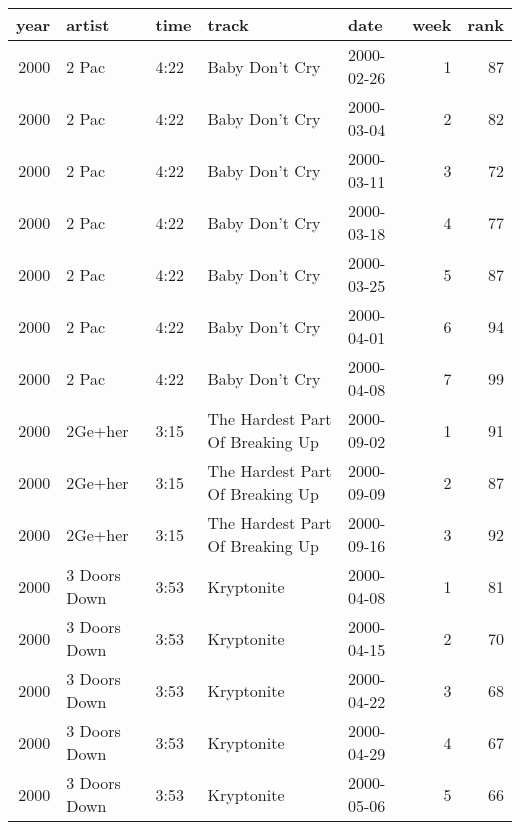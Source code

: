 \begin{tabular}{rllllrr}
  \toprule
 year & artist & time & track & date & week & rank \\ 
  \midrule
  2000 & 2 Pac & 4:22 & Baby Don't Cry & 2000-02-26 &   1 &  87 \\ 
  2000 & 2 Pac & 4:22 & Baby Don't Cry & 2000-03-04 &   2 &  82 \\ 
  2000 & 2 Pac & 4:22 & Baby Don't Cry & 2000-03-11 &   3 &  72 \\ 
  2000 & 2 Pac & 4:22 & Baby Don't Cry & 2000-03-18 &   4 &  77 \\ 
  2000 & 2 Pac & 4:22 & Baby Don't Cry & 2000-03-25 &   5 &  87 \\ 
  2000 & 2 Pac & 4:22 & Baby Don't Cry & 2000-04-01 &   6 &  94 \\ 
  2000 & 2 Pac & 4:22 & Baby Don't Cry & 2000-04-08 &   7 &  99 \\ 
  2000 & 2Ge+her & 3:15 & The Hardest Part Of Breaking Up & 2000-09-02 &   1 &  91 \\ 
  2000 & 2Ge+her & 3:15 & The Hardest Part Of Breaking Up & 2000-09-09 &   2 &  87 \\ 
  2000 & 2Ge+her & 3:15 & The Hardest Part Of Breaking Up & 2000-09-16 &   3 &  92 \\ 
  2000 & 3 Doors Down & 3:53 & Kryptonite & 2000-04-08 &   1 &  81 \\ 
  2000 & 3 Doors Down & 3:53 & Kryptonite & 2000-04-15 &   2 &  70 \\ 
  2000 & 3 Doors Down & 3:53 & Kryptonite & 2000-04-22 &   3 &  68 \\ 
  2000 & 3 Doors Down & 3:53 & Kryptonite & 2000-04-29 &   4 &  67 \\ 
  2000 & 3 Doors Down & 3:53 & Kryptonite & 2000-05-06 &   5 &  66 \\ 
   \bottomrule
\end{tabular}
